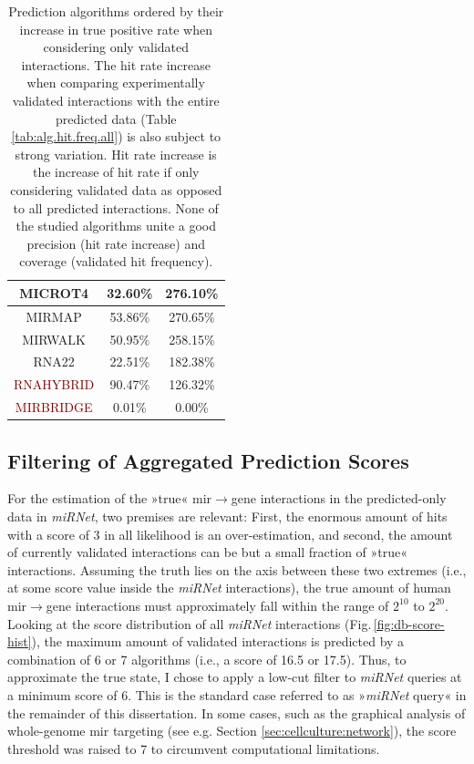 \begin{table}
{\begin{tabular}{c | c | c}
\textcolor{OliveGreen}{MICROT4} & 32.60\% & 276.10\%\\ \hline
\textcolor{OliveGreen}{MIRMAP} & 53.86\% & 270.65\%\\ \hline
\textcolor{OliveGreen}{MIRWALK} & 50.95\% & 258.15\%\\ \hline
\textcolor{OliveGreen}{RNA22} & 22.51\% & 182.38\%\\ \hline
\textcolor{Maroon}{RNAHYBRID} & 90.47\% & 126.32\%\\ \hline
\textcolor{Maroon}{MIRBRIDGE} & 0.01\% & 0.00\%\\ \hline
\end{tabular}
\caption{Prediction algorithms ordered by their increase in true positive rate when considering only validated interactions. The hit rate increase when comparing experimentally validated interactions with the entire predicted data (Table \ref{tab:alg.hit.freq.all}) is also subject to strong variation. Hit rate increase is the increase of hit rate if only considering validated data as opposed to all predicted interactions. None of the studied algorithms unite a good precision (hit rate increase) and coverage (validated hit frequency).}
\label{tab:alg.hit.freq.val}
}
\end{table}

\subsection{Filtering of Aggregated Prediction Scores}
For the estimation of the »true« \ac{mir}$\to$gene interactions in the predicted-only data in \textit{miRNet}, two premises are relevant: First, the enormous amount of hits with a score of 3 in all likelihood is an over-estimation, and second, the amount of currently validated interactions can be but a small fraction of »true« interactions. Assuming the truth lies on the axis between these two extremes (i.e., at some score value inside the \textit{miRNet} interactions), the true amount of human \ac{mir}$\to$gene interactions must approximately fall within the range of $2^{10}$ to $2^{20}$. Looking at the score distribution of all \textit{miRNet} interactions (Fig.\,\ref{fig:db-score-hist}), the maximum amount of validated interactions is predicted by a combination of 6 or 7 algorithms (i.e., a score of 16.5 or 17.5). Thus, to approximate the true state, I chose to apply a low-cut filter to \textit{miRNet} queries at a minimum score of 6. This is the standard case referred to as »\textit{miRNet} query« in the remainder of this dissertation. In some cases, such as the graphical analysis of whole-genome \ac{mir} targeting (see e.g. Section \ref{sec:cellculture:network}), the score threshold was raised to 7 to circumvent computational limitations.

